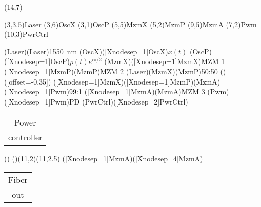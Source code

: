 \documentclass[pstricks]{standalone}
\begin{document}
	\begin{pspicture}(14,7)
		\begin{optexp}
			
		  	\pnode(3,3.5){Laser}
		  	\pnode(3,6){OscX}
		  	\pnode(3,1){OscP}
		  	\pnode(5,5){MzmX}
		  	\pnode(5,2){MzmP}
		  	\pnode(9,5){MzmA}
		  	\pnode(7,2){Pwm}
		  	\pnode(10,3){PwrCtrl}
		  	
			\optbox[position=start, optboxsize=2 1, labeloffset=0](Laser)(Laser){\SI{1550}{\nano\meter}}
			\elecsynthesizer[compname=OscX, wire=none, labeloffset=1.2, labelangle=-90](OscX)([Xnodesep=1]OscX){$x(t)$}
			\elecsynthesizer[compname=OscP, wire=none, labeloffset=1.2, labelangle=-90](OscP)([Xnodesep=1]OscP){$p(t)e^{i\pi/2}$}
			\optmzm[compname=MzmX, extnode=t](MzmX)([Xnodesep=1]MzmX){MZM 1}
			\optmzm[compname=MzmP, extnode=b]([Xnodesep=1]MzmP)(MzmP){MZM 2}
			\wdmsplitter[labeloffset=0.5](Laser)(MzmX)(MzmP){50:50}
			()
			([offset=-0.35])
			\optcoupler[labeloffset=0.5]([Xnodesep=1]MzmX)([Xnodesep=1]MzmP)(MzmA)([Xnodesep=1]Pwm){99:1}
			\optmzm[compname=MzmA, extnode=b]([Xnodesep=1]MzmA)(MzmA){MZM 3}
			\optdetector[compname=PD, extnode=r, dettype=diode](Pwm)([Xnodesep=1]Pwm){PD}
			\optbox[compname=PwrCtrl, labeloffset=0, optboxsize=2 1](PwrCtrl)([Xnodesep=2]PwrCtrl){\begin{tabular}{@{}c@{}}Power\\controller\end{tabular}}
			()
			\drawwire()(11,2)(11,2.5)
			\optfiber[addtoFiberOut={arrows=->}]([Xnodesep=1]MzmA)([Xnodesep=4]MzmA){\begin{tabular}{@{}c@{}}Fiber\\out\end{tabular}}
		\end{optexp}
	\end{pspicture}
\end{document}

